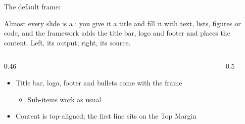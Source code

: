 
\begin{standardframe}{The default frame: }
	{\small Almost every slide is a : you give it a title
	and fill it with text, lists, figures or code, and the framework adds the
	title bar, logo and footer and places the content. Left, its output; right,
	its source.\par}
	\begin{columns}[T,onlytextwidth]
		\begin{column}{0.46\linewidth}
			\begin{itemize}
				\item Title bar, logo, footer and bullets come with the frame
				\begin{itemize}
					\item Sub-items work as usual
				\end{itemize}
				\item Content is top-aligned; the first line sits on the Top Margin
			\end{itemize}
		\end{column}
		\begin{column}{0.5\linewidth}
		\end{column}
	\end{columns}
\end{standardframe}
